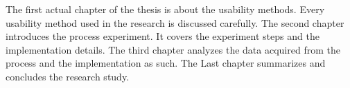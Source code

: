 \documentclass[12pt,a4paper,oneside,pdftex]{report}
\begin{document}
The first actual chapter of the thesis is about the usability methods. Every usability method used in the research is discussed carefully. The second chapter introduces the process experiment. It covers the experiment steps and the implementation details. The third chapter analyzes the data acquired from the process and the implementation as such. The Last chapter summarizes and concludes the research study.

    
    









\end{document}
